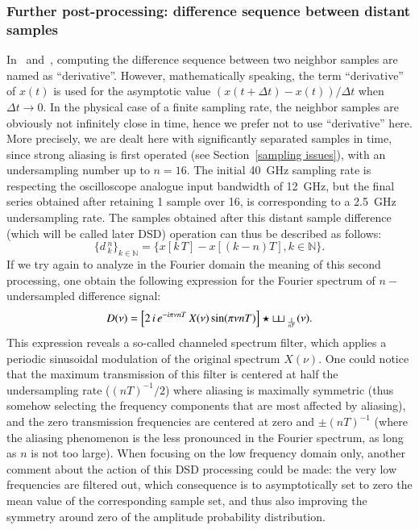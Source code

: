 \subsubsection{Further post-processing: difference sequence between
  distant samples}
\label{dsd}
%
In~\cite{ultrafast2009} and~\cite{ultrafast2010}, computing the
difference sequence between two neighbor samples are named as
``derivative''. However, mathematically speaking, the term
``derivative'' of $x(t)$ is used for the asymptotic value $(
x(t+\Delta t)-x(t) )/ \Delta t$ when $\Delta t\rightarrow 0$. In the
physical case of a finite sampling rate, the neighbor samples are
obviously not infinitely close in time, hence we prefer not to use
``derivative'' here. More precisely, we are dealt here with
significantly separated samples in time, since strong aliasing is
first operated (see Section~\ref{sampling issues}), with an
undersampling number up to $n=16$. The initial 40~GHz sampling rate is
respecting the oscilloscope analogue input bandwidth of 12~GHz, but
the final series obtained after retaining 1 sample over 16, is
corresponding to a 2.5~GHz undersampling rate. The samples obtained
after this distant sample difference (which will be called later DSD)
operation can thus be described as follows:
%
\begin{equation}
  \label{eq:diff_samples}
  \{d\,_k^n\}_{k\in\mathbb{N}} = \{x[k\,T]-x[(k-n)T],
  k\in\mathbb{N}\}.
\end{equation}
%
If we try again to analyze in the Fourier domain the meaning of this
second processing, one obtain the following expression for the Fourier
spectrum of $n-$undersampled difference signal:
%
\begin{equation}
  \label{eq:n-diff_spectrum}
  D(\nu) = \left[2\,i\,e^{-i\pi\nu nT}\, X(\nu)\sin(\pi\nu
    nT)\right] \star{\sqcup\!\sqcup}\,_\frac{1}{nT}(\nu).
\end{equation}
%
This expression reveals a so-called channeled spectrum filter, which
applies a periodic sinusoidal modulation of the original spectrum
$X(\nu)$. One could notice that the maximum transmission of this
filter is centered at half the undersampling rate ($(nT)^{-1}/2$)
where aliasing is maximally symmetric (thus somehow selecting the
frequency components that are most affected by aliasing), and the zero
transmission frequencies are centered at zero and $\pm(nT)^{-1}$
(where the aliasing phenomenon is the less pronounced in the Fourier
spectrum, as long as $n$ is not too large). When focusing on the low
frequency domain only, another comment about the action of this DSD
processing could be made: the very low frequencies are filtered out,
which consequence is to asymptotically set to zero the mean value of
the corresponding sample set, and thus also improving the symmetry
around zero of the amplitude probability distribution.

